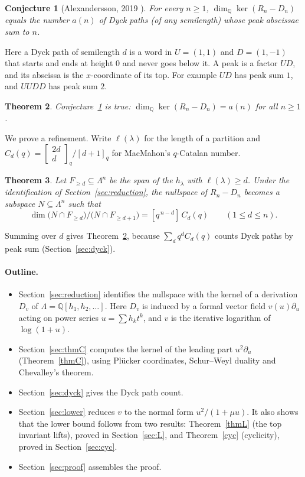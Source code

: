 \documentclass[11pt]{article}
\newtheorem{theorem}{Theorem}
\newtheorem{conjecture}[theorem]{Conjecture}
\theoremstyle{definition}
\theoremstyle{remark}
\newcommand{\Q}{\mathbb{Q}}
\newcommand{\La}{\Lambda}
\newcommand{\qbin}[2]{\begin{bmatrix}#1\\#2\end{bmatrix}_q}
\begin{document}
\begin{conjecture}[{Alexandersson, 2019 \cite{SymCat}}]\label{conj}
For every $n\ge1$, $\dim_\Q\ker(R_n-D_n)$ equals the number $a(n)$ of Dyck paths (of any semilength) whose peak
abscissae sum to $n$.
\end{conjecture}

Here a Dyck path of semilength $d$ is a word in $U=(1,1)$ and $D=(1,-1)$ that starts and ends at height $0$ and never
goes below it. A peak is a factor $UD$, and its abscissa is the $x$-coordinate of its top. For example $UD$ has
peak sum $1$, and $UUDD$ has peak sum $2$.

\begin{theorem}\label{main}
Conjecture~\ref{conj} is true: $\dim_\Q\ker(R_n-D_n)=a(n)$ for all $n\ge1$.
\end{theorem}

We prove a refinement. Write $\ell(\lambda)$ for the length of a partition and $C_d(q)=\qbin{2d}{d}/[d+1]_q$
for MacMahon's $q$-Catalan number.

\begin{theorem}\label{refined}
Let $F_{\ge d}\subseteq\La^n$ be the span of the $h_\lambda$ with $\ell(\lambda)\ge d$. Under the identification
of Section~\ref{sec:reduction}, the nullspace of $R_n-D_n$ becomes a subspace $N\subseteq\La^n$ such that
\[
  \dim\bigl(N\cap F_{\ge d}\bigr)/\bigl(N\cap F_{\ge d+1}\bigr)=[q^{\,n-d}]\,C_d(q)\qquad(1\le d\le n).
\]
\end{theorem}

Summing over $d$ gives Theorem~\ref{main}, because $\sum_d q^dC_d(q)$ counts Dyck paths by peak sum
(Section~\ref{sec:dyck}).

\paragraph{Outline.}
\begin{itemize}
\item Section~\ref{sec:reduction} identifies the nullspace with the kernel of a derivation $D_v$ of
$\La=\Q[h_1,h_2,\dots]$. Here $D_v$ is induced by a formal vector field $v(u)\partial_u$ acting on power
series $u=\sum h_kt^k$, and $v$ is the iterative logarithm of $\log(1+u)$.
\item Section~\ref{sec:thmC} computes the kernel of the leading part $u^2\partial_u$ (Theorem~\ref{thmC}),
using Pl\"ucker coordinates, Schur--Weyl duality and Chevalley's theorem.
\item Section~\ref{sec:dyck} gives the Dyck path count.
\item Section~\ref{sec:lower} reduces $v$ to the normal form $u^2/(1+\mu u)$. It also shows that the lower bound
follows from two results: Theorem~\ref{thmL} (the top invariant lifts), proved in Section~\ref{sec:L}, and
Theorem~\ref{cyc} (cyclicity), proved in Section~\ref{sec:cyc}.
\item Section~\ref{sec:proof} assembles the proof.
\end{itemize}
\end{document}

